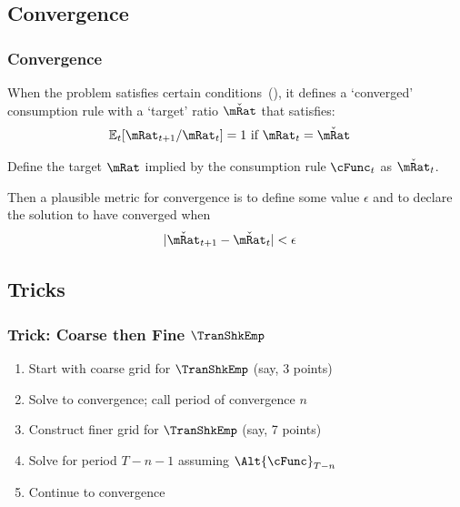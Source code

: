\documentclass{beamer}
\providecommand{\Ex}{\ensuremath{\mathbb{E}}} %
\begin{document}
\subsection{Convergence}
\begin{frame}
\frametitle{Convergence}

When the problem satisfies certain conditions~(\cite{BufferStockTheory}),
it defines a `converged' consumption rule with a `target' ratio $\check{\mRat}$
that satisfies:
\begin{equation}\begin{gathered}\begin{aligned}
  \Ex_{t}[\mRat_{t+1}/\mRat_{t}]  & = 1 \text{~if $\mRat_{t} = \check{\mRat}$}
\end{aligned}\end{gathered}\end{equation}

\pause 

Define the target $\mRat$ implied by the consumption rule $\cFunc_{t}$ as $\check{\mRat}_{t}$.

\medskip\pause
Then a plausible metric for convergence is to define some value $\epsilon$ and to declare
the solution to have converged when
\begin{equation}\begin{gathered}\begin{aligned}
  |\check{\mRat}_{t+1}-\check{\mRat}_{t}|  & < \epsilon
\end{aligned}\end{gathered}\end{equation}

\end{frame}

\subsection{Tricks}
\begin{frame}
\frametitle{Trick: Coarse then Fine $\TranShkEmp$}

\begin{enumerate}
\item Start with coarse grid for $\TranShkEmp$ (say, 3 points)
\item Solve to convergence; call period of convergence $n$
\item Construct finer grid for $\TranShkEmp$ (say, 7 points)
\item Solve for period $T-n-1$ assuming $\Alt{\cFunc}_{T-n}$ 
\item Continue to convergence
\end{enumerate}

\end{frame}
\end{document}
